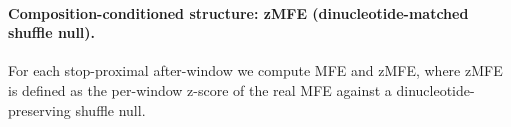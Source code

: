 \paragraph{Composition-conditioned structure: zMFE (dinucleotide-matched shuffle null).}
For each stop-proximal after-window we compute MFE and zMFE, where zMFE is defined as the per-window z-score of the real MFE against a dinucleotide-preserving shuffle null.
